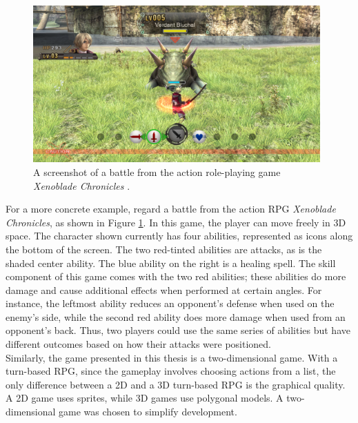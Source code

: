 \begin{figure}[H]
  \centering
  \includegraphics[width=11cm]{figures/Xenoblade.png}
  \caption{A screenshot of a battle from the action role-playing game \textit{Xenoblade Chronicles} \cite{xenoblade10}.}
  \label{fig:Xenoblade}
\end{figure}

For a more concrete example, regard a battle from the action RPG \textit{Xenoblade Chronicles}, as shown in Figure \ref{fig:Xenoblade}. In this game, the player can move freely in 3D space. The character shown currently has four abilities, represented as icons along the bottom of the screen. The two red-tinted abilities are attacks, as is the shaded center ability. The blue ability on the right is a healing spell. The skill component of this game comes with the two red abilities; these abilities do more damage and cause additional effects when performed at certain angles. For instance, the leftmost ability reduces an opponent's defense when used on the enemy's side, while the second red ability does more damage when used from an opponent's back. Thus, two players could use the same series of abilities but have different outcomes based on how their attacks were positioned.\\

Similarly, the game presented in this thesis is a two-dimensional game. With a turn-based RPG, since the gameplay involves choosing actions from a list, the only difference between a 2D and a 3D turn-based RPG is the graphical quality. A 2D game uses sprites, while 3D games use polygonal models. A two-dimensional game was chosen to simplify development.\\

